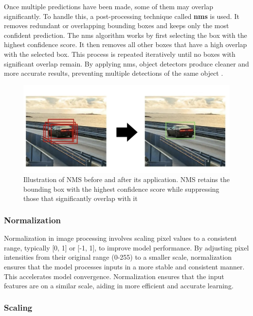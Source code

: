  Once multiple predictions have been made, some of them may overlap significantly. To handle this, a post-processing technique called \textbf{\gls{nms}} is used. It removes redundant or overlapping bounding boxes and keeps only the most confident prediction. The \gls{nms} algorithm works by first selecting the box with the highest confidence score. It then removes all other boxes that have a high overlap with the selected box. This process is repeated iteratively until no boxes with significant overlap remain. By applying \gls{nms}, object detectors produce cleaner and more accurate results, preventing multiple detections of the same object
\cite{thepythoncode:nms}.

\newpage

\begin{figure}[h!]
    \centering
    \includegraphics[width=0.75\linewidth]{figures/theory/image-recognition/nms.png}
    \caption[Non-maximum suppression (NMS) before and after applying the algorithm]{Illustration of NMS before and after its application. NMS retains the bounding box with the highest confidence score while suppressing those that significantly overlap with it \cite{thepythoncode:nms}}
    \label{fig:nms}
\end{figure}

\subsubsection*{Normalization}

Normalization in image processing involves scaling pixel values to a consistent range, typically [0, 1] or [-1, 1], to improve model performance. By adjusting pixel intensities from their original range (0-255) to a smaller scale, normalization ensures that the model processes inputs in a more stable and consistent manner. This accelerates model convergence. Normalization ensures that the input features are on a similar scale, aiding in more efficient and accurate learning.

\subsubsection*{Scaling}

